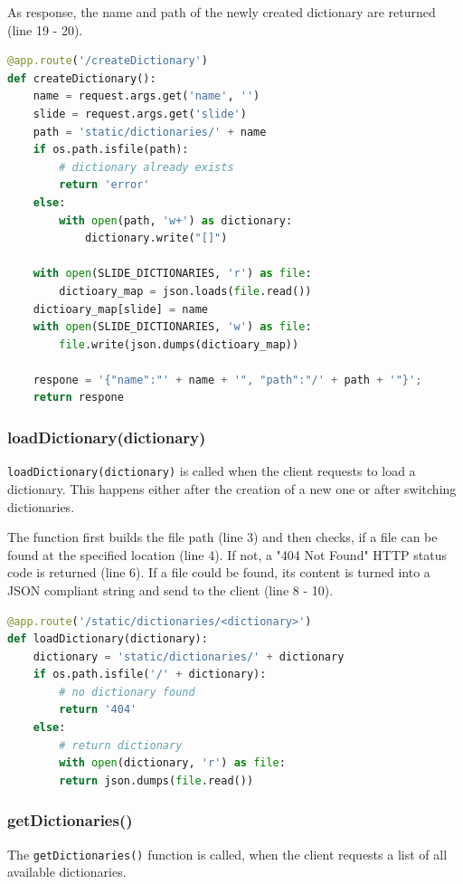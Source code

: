 As response, the name and path of the newly created dictionary are returned (line 19 - 20).

\begin{lstlisting}[language=Python, frame=single]
@app.route('/createDictionary')
def createDictionary():
	name = request.args.get('name', '')
	slide = request.args.get('slide')
	path = 'static/dictionaries/' + name
	if os.path.isfile(path):
		# dictionary already exists
		return 'error'
	else:
		with open(path, 'w+') as dictionary:
			dictionary.write("[]")
	
	with open(SLIDE_DICTIONARIES, 'r') as file:
		dictioary_map = json.loads(file.read())
	dictioary_map[slide] = name
	with open(SLIDE_DICTIONARIES, 'w') as file:
		file.write(json.dumps(dictioary_map))

	respone = '{"name":"' + name + '", "path":"/' + path + '"}';
	return respone
\end{lstlisting}

\subsubsection{loadDictionary(dictionary)}

\texttt{loadDictionary(dictionary)} is called when the client requests to load a dictionary. This happens either after the creation of a new one or after switching dictionaries.

The function first builds the file path (line 3) and then checks, if a file can be found at the specified location (line 4). If not, a "404 Not Found" HTTP status code is returned (line 6). If a file could be found, its content is turned into a JSON compliant string and send to the client (line 8 - 10).

\begin{lstlisting}[language=Python, frame=single]
@app.route('/static/dictionaries/<dictionary>')
def loadDictionary(dictionary):
	dictionary = 'static/dictionaries/' + dictionary
	if os.path.isfile('/' + dictionary):
		# no dictionary found
		return '404'
	else:
		# return dictionary
		with open(dictionary, 'r') as file:
		return json.dumps(file.read())
\end{lstlisting}

\subsubsection{getDictionaries()}
The \texttt{getDictionaries()} function is called, when the client requests a list of all available dictionaries.

